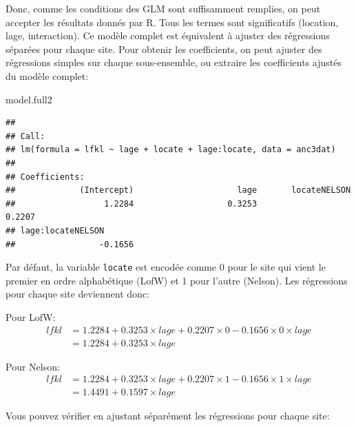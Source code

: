 \documentclass[
  12pt,
]{book}
\newenvironment{Shaded}{\begin{snugshade}}{\end{snugshade}}
\newcommand{\ControlFlowTok}[1]{\textcolor[rgb]{0.13,0.29,0.53}{\textbf{#1}}}
\newcommand{\DataTypeTok}[1]{\textcolor[rgb]{0.13,0.29,0.53}{#1}}
\newcommand{\KeywordTok}[1]{\textcolor[rgb]{0.13,0.29,0.53}{\textbf{#1}}}
\newcommand{\NormalTok}[1]{#1}
\newcommand{\OperatorTok}[1]{\textcolor[rgb]{0.81,0.36,0.00}{\textbf{#1}}}
\begin{document}
Donc, comme les conditions des GLM sont suffisamment remplies, on peut accepter les résultats donnés par R. Tous les termes sont significatifs (location, lage, interaction). Ce modèle complet est équivalent à ajuster des régressions séparées pour chaque site. Pour obtenir les coefficients, on peut ajuster des régressions simples sur chaque sous-ensemble, ou extraire les coefficients ajustés du modèle complet:

\begin{Shaded}
\begin{Highlighting}[]
\NormalTok{model.full2}
\end{Highlighting}
\end{Shaded}

\begin{verbatim}
## 
## Call:
## lm(formula = lfkl ~ lage + locate + lage:locate, data = anc3dat)
## 
## Coefficients:
##             (Intercept)                     lage       locateNELSON        
##                  1.2284                   0.3253                   0.2207  
## lage:locateNELSON        
##                 -0.1656
\end{verbatim}

Par défaut, la variable \texttt{locate} est encodée comme 0 pour le site qui vient le premier en ordre alphabétique (LofW) et 1 pour l'autre (Nelson). Les régressions pour chaque site deviennent donc:

Pour LofW:
\[\begin{aligned}
lfkl &= 1.2284 + 0.3253 \times lage + 0.2207 \times 0 - 0.1656 \times 0 \times lage \\
 &= 1.2284 + 0.3253 \times lage
\end{aligned}\]

Pour Nelson:
\[\begin{aligned}
lfkl &= 1.2284 + 0.3253 \times lage + 0.2207 \times 1 - 0.1656 \times 1 \times lage \\
 &= 1.4491 + 0.1597 \times lage
\end{aligned}\]

Vous pouvez vérifier en ajustant séparément les régressions pour chaque site:

\begin{Shaded}
\end{Shaded}
\end{document}

